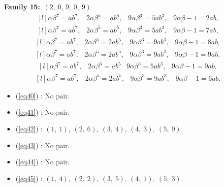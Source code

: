 \documentclass[12pt,a4wide, reqno]{amsart}
\theoremstyle{definition}
\theoremstyle{remark}
\numberwithin{equation}{section}
\begin{document}
    \textbf{Family 15:}~$(2,~0,~9,~0,~9)$ 
\begin{equation}\label{eq40}
    \begin{matrix*}[l]
         \alpha \beta ^7=ab^7, & 2\alpha \beta ^5=ab^5, & 9\alpha \beta ^3=5ab ^3, & 9\alpha\beta-1=2ab,
    \end{matrix*}
\end{equation}
\begin{equation}\label{eq41}
    \begin{matrix*}[l]
          \alpha \beta ^7=ab^7, & 2\alpha \beta ^5=ab^5, & 9\alpha \beta ^3=5ab ^3, & 9\alpha\beta-1=7ab,
    \end{matrix*}
\end{equation}
\begin{equation}\label{eq42}
    \begin{matrix*}[l]
          \alpha \beta ^7=ab^7, & 2\alpha \beta ^5=2ab^5, & 9\alpha \beta ^3=9ab ^3, & 9\alpha\beta-1=8ab,
    \end{matrix*}
\end{equation}
\begin{equation}\label{eq43}
    \begin{matrix*}[l]
          \alpha \beta ^7=ab^7, & 2\alpha \beta ^5=2ab^5, & 9\alpha \beta ^3=9ab^3, & 9\alpha\beta-1=9ab,
    \end{matrix*}
\end{equation}
\begin{equation}\label{eq44}
    \begin{matrix*}[l]
          \alpha \beta ^7=ab^7, & 2\alpha \beta ^5=ab^5 & 9\alpha \beta ^3=5ab ^3, & 9\alpha\beta-1=9ab,
    \end{matrix*}
\end{equation}
\begin{equation}\label{eq45}
    \begin{matrix*}[l]
          \alpha \beta ^7=ab^7, & 2\alpha \beta ^5=2ab^5, & 9\alpha \beta ^3=9ab ^3, & 9\alpha\beta-1=6ab.
    \end{matrix*}
\end{equation}

\begin{itemize}
    \item 
    (\ref{eq40}) : No pair.
    \item 
    (\ref{eq41}) : No pair.
    \item 
    (\ref{eq42}) : $(1,~1),~(2,~6),~(3,~4),~(4,~3),~(5,~9).$
    \item 
    (\ref{eq43}) : No pair.
    \item 
    (\ref{eq44}) : No pair.
    \item
    (\ref{eq45}) : $(1,~4),~(2,~2),~(3,~5),~(4,~1),~(5,~3).$
    \end{itemize}
    
\end{document}
